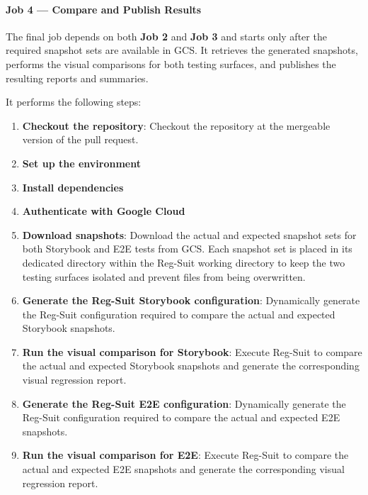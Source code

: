 \paragraph{Job 4 --- Compare and Publish Results}

The final job depends on both \textbf{Job 2} and \textbf{Job 3} and starts only after the required snapshot sets are available in \ac{GCS}. It retrieves the generated snapshots, performs the visual comparisons for both testing surfaces, and publishes the resulting reports and summaries.

It performs the following steps:

\begin{enumerate}
    \item \textbf{Checkout the repository}: Checkout the repository at the mergeable version of the pull request.

    \item \textbf{Set up the environment}

    \item \textbf{Install dependencies}

    \item \textbf{Authenticate with Google Cloud}

    \item \textbf{Download snapshots}: Download the actual and expected snapshot sets for both Storybook and E2E tests from \ac{GCS}. Each snapshot set is placed in its dedicated directory within the Reg-Suit working directory to keep the two testing surfaces isolated and prevent files from being overwritten.

    \item \textbf{Generate the Reg-Suit Storybook configuration}: Dynamically generate the Reg-Suit configuration required to compare the actual and expected Storybook snapshots.

    \item \textbf{Run the visual comparison for Storybook}: Execute Reg-Suit to compare the actual and expected Storybook snapshots and generate the corresponding visual regression report.

    \item \textbf{Generate the Reg-Suit E2E configuration}: Dynamically generate the Reg-Suit configuration required to compare the actual and expected E2E snapshots.

    \item \textbf{Run the visual comparison for E2E}: Execute Reg-Suit to compare the actual and expected E2E snapshots and generate the corresponding visual regression report.


\end{enumerate}
